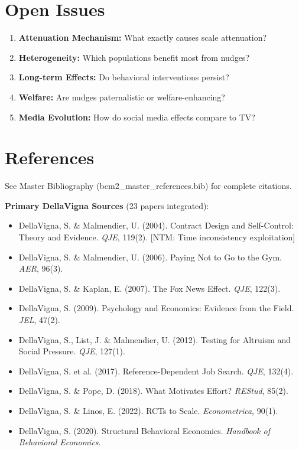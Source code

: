\section{Open Issues}

\begin{enumerate}
    \item \textbf{Attenuation Mechanism:} What exactly causes scale attenuation?
    \item \textbf{Heterogeneity:} Which populations benefit most from nudges?
    \item \textbf{Long-term Effects:} Do behavioral interventions persist?
    \item \textbf{Welfare:} Are nudges paternalistic or welfare-enhancing?
    \item \textbf{Media Evolution:} How do social media effects compare to TV?
\end{enumerate}

\section{References}

See Master Bibliography (bcm2\_master\_references.bib) for complete citations.

\nocite{bcm_master}

\textbf{Primary DellaVigna Sources} (23 papers integrated):

\begin{itemize}
    \item DellaVigna, S. \& Malmendier, U. (2004). Contract Design and Self-Control: Theory and Evidence. \textit{QJE}, 119(2). [NTM: Time inconsistency exploitation]
    \item DellaVigna, S. \& Malmendier, U. (2006). Paying Not to Go to the Gym. \textit{AER}, 96(3).
    \item DellaVigna, S. \& Kaplan, E. (2007). The Fox News Effect. \textit{QJE}, 122(3).
    \item DellaVigna, S. (2009). Psychology and Economics: Evidence from the Field. \textit{JEL}, 47(2).
    \item DellaVigna, S., List, J. \& Malmendier, U. (2012). Testing for Altruism and Social Pressure. \textit{QJE}, 127(1).
    \item DellaVigna, S. et al. (2017). Reference-Dependent Job Search. \textit{QJE}, 132(4).
    \item DellaVigna, S. \& Pope, D. (2018). What Motivates Effort? \textit{REStud}, 85(2).
    \item DellaVigna, S. \& Linos, E. (2022). RCTs to Scale. \textit{Econometrica}, 90(1).
    \item DellaVigna, S. (2020). Structural Behavioral Economics. \textit{Handbook of Behavioral Economics}.
\end{itemize}


